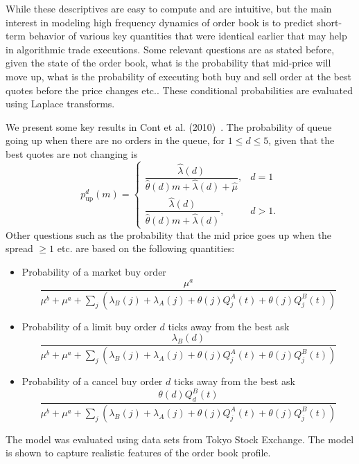 While these descriptives are easy to compute and are intuitive, but the main interest in modeling high frequency dynamics of order book is to predict short-term behavior of various key quantities that were identical earlier that may help in algorithmic trade executions. Some relevant questions are as stated before, given the state of the order book, what is the probability that mid-price will move up, what is the probability of executing both buy and sell order at the best quotes before the price changes etc.. These conditional probabilities are evaluated using Laplace transforms.


We present some key results in Cont et al. (2010)~\cite{contstoi}. The probability of queue going up when there are no orders in the queue, for $1 \leq d \leq 5$, given that the best quotes are not changing is
	\begin{equation}\label{eqn:queuecon}
	p_{\text{up}}^d(m)=
	\begin{cases}
	\dfrac{\hat{\lambda}(d)}{\hat{\theta}(d)m+\hat{\lambda}(d)+\hat{\mu}}, & d=1 \\
	\dfrac{\hat{\lambda}(d)}{\hat{\theta}(d)m+\hat{\lambda}(d)}, & d>1.
	\end{cases}
	\end{equation}
Other questions such as the probability that the mid price goes up when the spread $\geq 1$ etc. are based on the following quantities:
\begin{itemize}
\item Probability of a market buy order
	\begin{equation}\label{eqn:probmarketbuy}
	\dfrac{\mu^a}{\mu^b+\mu^a+\sum_j (\lambda_B(j)+\lambda_A(j)+\theta(j) Q_j^A(t)+\theta(j)Q_j^B(t))}
	\end{equation}
\item Probability of a limit buy order $d$ ticks away from the best ask
	\begin{equation}\label{eqn:problimitbuytick}
	\dfrac{\lambda_B(d)}{\mu^b+\mu^a+\sum_j(\lambda_B(j)+\lambda_A(j)+\theta(j)Q_j^A(t)+\theta(j)Q_j^B(t))}
	\end{equation}
\item Probability of a cancel buy order $d$ ticks away from the best ask
	\begin{equation}\label{eqn:probcanceltick}
	\dfrac{\theta(d)Q_d^B(t)}{\mu^b+\mu^a+\sum_j(\lambda_B(j)+\lambda_A(j)+\theta(j)Q_j^A(t)+\theta(j)Q_j^B(t))}
	\end{equation}
\end{itemize}
The model was evaluated using data sets from Tokyo Stock Exchange. The model is shown to capture realistic features of the order book profile.
